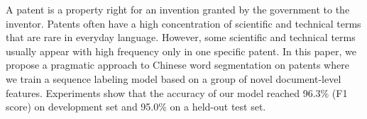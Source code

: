 A patent is a property right for an invention granted by the government to the inventor. Patents often have a high concentration of scientific and technical terms that are rare in everyday language. However, some scientific and technical terms usually appear with high frequency only in one specific patent. In this paper, we propose a pragmatic approach to Chinese word segmentation on patents where we train a sequence labeling model based on a group of novel document-level features. Experiments show that the accuracy of our model reached 96.3\% (F1 score) on development set and 95.0\% on a held-out test set.
